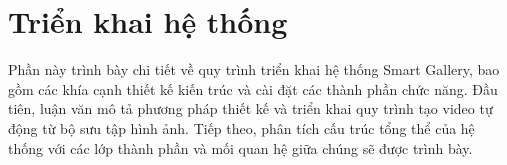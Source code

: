 \section{Triển khai hệ thống}

Phần này trình bày chi tiết về quy trình triển khai hệ thống Smart Gallery, bao gồm các khía cạnh thiết kế kiến trúc và cài đặt các thành phần chức năng. Đầu tiên, luận văn mô tả phương pháp thiết kế và triển khai quy trình tạo video tự động từ bộ sưu tập hình ảnh. Tiếp theo, phân tích cấu trúc tổng thể của hệ thống với các lớp thành phần và mối quan hệ giữa chúng sẽ được trình bày.




